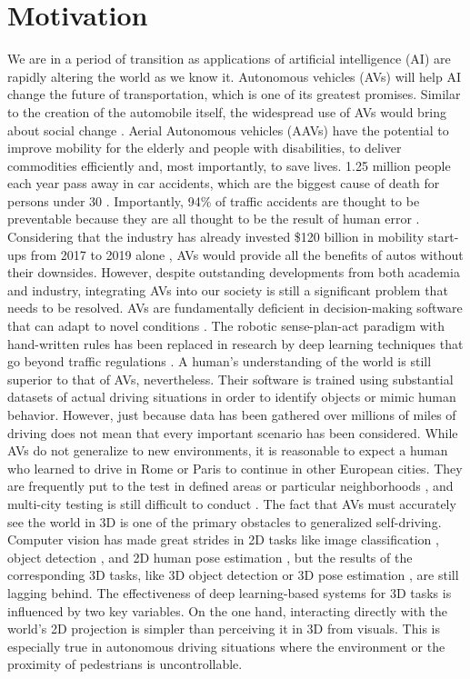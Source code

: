 \documentclass[english, LaM, oneside]{sapthesis}%
\begin{document}
\section{Motivation}

We are in a period of transition as applications of artificial intelligence (AI) are rapidly altering the world as we know it. Autonomous vehicles (AVs) will help AI change the future of transportation, which is one of its greatest promises. Similar to the creation of the automobile itself, the widespread use of AVs would bring about social change \cite{int1}. Aerial Autonomous vehicles (AAVs) have the potential to improve mobility for the elderly and people with disabilities, to deliver commodities efficiently and, most importantly, to save lives. 1.25 million people each year pass away in car accidents, which are the biggest cause of death for persons under 30 \cite{int2}. Importantly, 94\% of traffic accidents are thought to be preventable because they are all thought to be the result of human error \cite{int3}. Considering that the industry has already invested \$120 billion in mobility start-ups from 2017 to 2019 alone \cite{int4}, AVs would provide all the benefits of autos without their downsides. However, despite outstanding developments from both academia and industry, integrating AVs into our society is still a significant problem that needs to be resolved. 
AVs are fundamentally deficient in decision-making software that can adapt to novel conditions \cite{int1}. The robotic sense-plan-act paradigm with hand-written rules has been replaced in research by deep learning techniques that go beyond traffic regulations \cite{int5}. A human's understanding of the world is still superior to that of AVs, nevertheless. Their software is trained using substantial datasets of actual driving situations in order to identify objects or mimic human behavior. However, just because data has been gathered over millions of miles of driving does not mean that every important scenario has been considered. While AVs do not generalize to new environments, it is reasonable to expect a human who learned to drive in Rome or Paris to continue in other European cities. They are frequently put to the test in defined areas or particular neighborhoods \cite{int6}, and multi-city testing is still difficult to conduct \cite{int7}. 
The fact that AVs must accurately see the world in 3D is one of the primary obstacles to generalized self-driving. Computer vision has made great strides in 2D tasks like image classification \cite{int8, int9}, object detection \cite{int10, int11}, and 2D human pose estimation \cite{int12, int13}, but the results of the corresponding 3D tasks, like 3D object detection \cite{int14, int15} or 3D pose estimation \cite{int16}, are still lagging behind. The effectiveness of deep learning-based systems for 3D tasks is influenced by two key variables. On the one hand, interacting directly with the world's 2D projection is simpler than perceiving it in 3D from visuals. This is especially true in autonomous driving situations where the environment or the proximity of pedestrians is uncontrollable.
\end{document}
